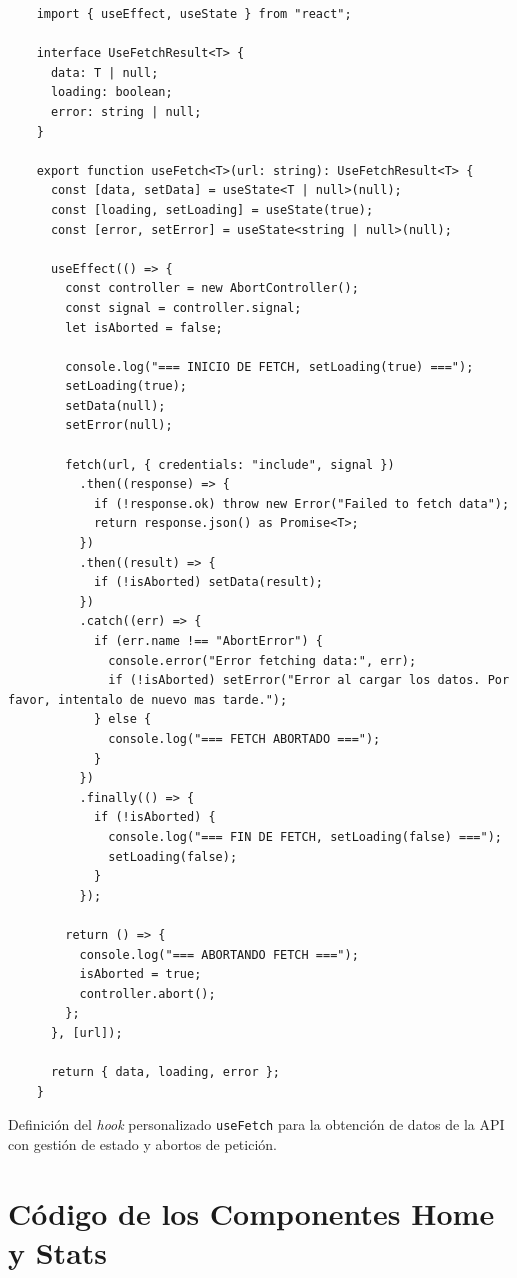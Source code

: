 \begin{ifalgorithm}[H]
  \begin{lstlisting}
    import { useEffect, useState } from "react";

    interface UseFetchResult<T> {
      data: T | null;
      loading: boolean;
      error: string | null;
    }

    export function useFetch<T>(url: string): UseFetchResult<T> {
      const [data, setData] = useState<T | null>(null);
      const [loading, setLoading] = useState(true);
      const [error, setError] = useState<string | null>(null);

      useEffect(() => {
        const controller = new AbortController();
        const signal = controller.signal;
        let isAborted = false;

        console.log("=== INICIO DE FETCH, setLoading(true) ===");
        setLoading(true);
        setData(null);
        setError(null);

        fetch(url, { credentials: "include", signal })
          .then((response) => {
            if (!response.ok) throw new Error("Failed to fetch data");
            return response.json() as Promise<T>;
          })
          .then((result) => {
            if (!isAborted) setData(result);
          })
          .catch((err) => {
            if (err.name !== "AbortError") {
              console.error("Error fetching data:", err);
              if (!isAborted) setError("Error al cargar los datos. Por favor, intentalo de nuevo mas tarde.");
            } else {
              console.log("=== FETCH ABORTADO ===");
            }
          })
          .finally(() => {
            if (!isAborted) {
              console.log("=== FIN DE FETCH, setLoading(false) ===");
              setLoading(false);
            }
          });

        return () => {
          console.log("=== ABORTANDO FETCH ===");
          isAborted = true;
          controller.abort();
        };
      }, [url]);

      return { data, loading, error };
    }
    \end{lstlisting}
  \caption{Definición del \textit{hook} personalizado \texttt{useFetch} para la obtención de datos de la API con gestión de estado y abortos de petición.}
  \label{alg:use_fetch}
\end{ifalgorithm}

\section*{Código de los Componentes Home y Stats}

